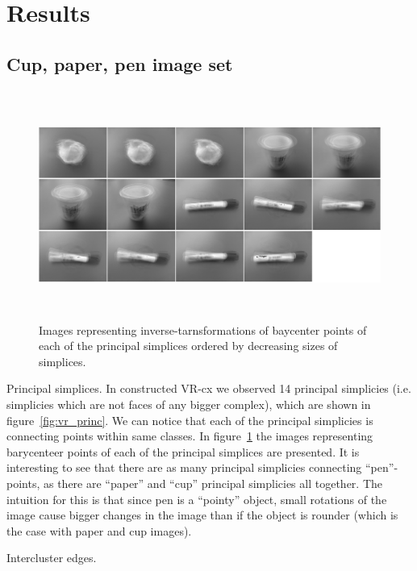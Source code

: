 \documentclass{article}
\newcommand{\enterProblemHeader}[1]{
}
\newcommand{\exitProblemHeader}[1]{
}
\newcounter{homeworkProblemCounter} %
\newcommand{\homeworkProblemName}{}
\newenvironment{homeworkProblem}[1][Problem \arabic{homeworkProblemCounter}]{ %
\stepcounter{homeworkProblemCounter} %
\renewcommand{\homeworkProblemName}{#1} %
\section{\homeworkProblemName} %
\enterProblemHeader{\homeworkProblemName} %
}{
\exitProblemHeader{\homeworkProblemName} %
}
\newcommand{\homeworkSectionName}{}
\newenvironment{homeworkSection}[1]{ %
\renewcommand{\homeworkSectionName}{#1} %
\subsection{\homeworkSectionName} %
\enterProblemHeader{\homeworkProblemName\ [\homeworkSectionName]} %
}{
\enterProblemHeader{\homeworkProblemName} %
}
\begin{document}
\begin{homeworkProblem}[Results]
\begin{homeworkSection}{Cup, paper, pen image set}
\begin{figure}[h]
    \centering
    \includegraphics[height=7.5cm]{img/princ}
    \caption{Images representing inverse-tarnsformations of baycenter points of each of the principal simplices ordered by decreasing sizes of simplices.}
    \label{fig:princ_barycenters}
\end{figure}

\begin{paragraph}{Principal simplices.} In constructed VR-cx we observed 14 principal simplicies (i.e. simplicies which are not faces of any bigger complex), which are shown in figure~\ref{fig:vr_princ}. We can notice that each of the principal simplicies is connecting points within same classes. In figure~\ref{fig:princ_barycenters} the images representing barycenteer points of each of the principal simplices are presented. It is interesting to see that there are as many principal simplicies connecting ``pen''-points, as there are ``paper'' and ``cup'' principal simplicies all together. The intuition for this is that since pen is a ``pointy'' object, small rotations of the image cause bigger changes in the image than if the object is rounder (which is the case with paper and cup images).

\end{paragraph}

\begin{paragraph}{Intercluster edges.}  


\end{paragraph}
\end{homeworkSection}
\end{homeworkProblem}
\end{document}
